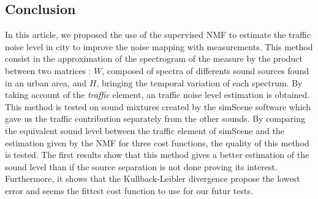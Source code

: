 \documentclass{article}
\begin{document}
\begin{sloppy}
\section{Conclusion}
In this article, we proposed the use of the supervised NMF to estimate the traffic noise level in city to improve the noise mapping with measurements. This method consist in the approximation of the spectrogram of the measure by the product between two matrices : $W$, composed of spectra of differents sound sources found in an urban area, and $H$,  bringing the temporal variation of each spectrum. By taking account of the \textit{traffic} element, an traffic noise level estimation is obtained. This method is tested on sound mixtures created by the simScene software which gave us the traffic contribution separately from the other sounds. By comparing the equivalent sound level between the traffic element of simScene and the estimation given by the NMF for three cost functions, the quality of this method is tested. The first results show that this method gives a better estimation of the sound level than if the source separation is not done proving its interest. Furthermore, it shows that the Kullback-Leibler divergence propose the lowest error and seems the fittest cost function to use for our futur tests.



\end{sloppy}
\end{document}
